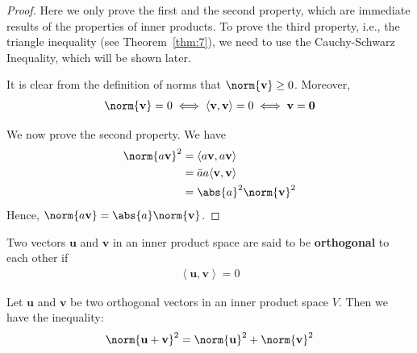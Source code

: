 \documentclass[thmcnt=section, color=blue, 12pt]{my-elegantbook}
\begin{document}
\begin{proof}
    Here we only prove the first and the second property, which are immediate results of the properties of inner products. To prove the third property, i.e., the triangle inequality (see Theorem~\ref{thm:7}), we need to use the Cauchy-Schwarz Inequality, which will be shown later. 

    \par It is clear from the definition of norms that $\norm{\mathbf{v}} \geq 0$. Moreover,
    \begin{align*}
        \norm{\mathbf{v}} = 0
        \iff \left\langle \mathbf{v}, \mathbf{v} \right\rangle = 0
        \iff \mathbf{v} = \mathbf{0}
    \end{align*}

    \par We now prove the second property. We have 
    \begin{align*}
        \norm{a \mathbf{v}}^2
        &= \langle a \mathbf{v}, a \mathbf{v} \rangle \\ 
        &= \bar{a} a \langle \mathbf{v}, \mathbf{v} \rangle \\ 
        &= \abs{a}^2 \norm{\mathbf{v}}^2
    \end{align*}
    Hence, $\norm{a \mathbf{v}} = \abs{a} \norm{\mathbf{v}}$.
\end{proof}


\begin{definition}
    Two vectors $ \mathbf{u} $ and $\mathbf{v}$ in an inner product space are said to be \textbf{orthogonal}  to each other if 
    \begin{align*}
        \left\langle \mathbf{u}, \mathbf{v} \right\rangle = 0
    \end{align*}
\end{definition}


\begin{theorem} \label{thm:9}
    Let $\mathbf{u}$ and $\mathbf{v}$ be two orthogonal vectors in an inner product space $V$. Then we have the inequality:
    \begin{align}
        \norm{\mathbf{u} + \mathbf{v}}^2
        = \norm{\mathbf{u}}^2 + \norm{\mathbf{v}}^2
        \label{eq:20}
    \end{align}
\end{theorem}
\end{document}
